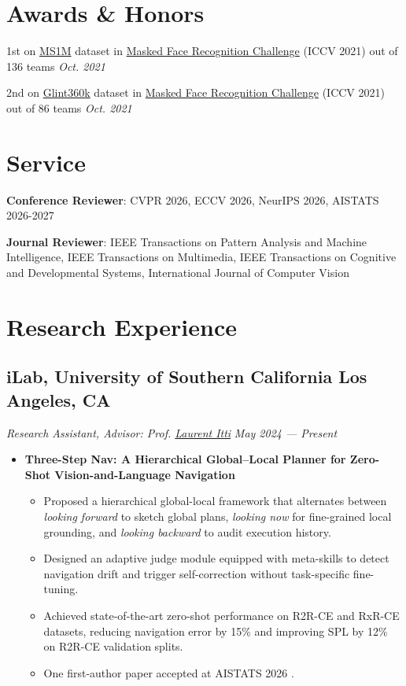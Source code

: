 \documentclass[a4,10pt]{article}
\newcommand{\subtext}[1]{
#1\par\vspace{-0.2cm}}
\newenvironment{zitemize}{
\begin{itemize}\itemsep0pt \parskip0pt \parsep1pt}
{\end{itemize}\vspace{-0.5cm}}
\begin{document}
\vspace{0.15cm}
\section{Awards \& Honors}
\noindent 1st on \href {https://arxiv.org/abs/1607.08221} {MS1M} dataset in \href {https://arxiv.org/abs/2108.08191} {Masked Face Recognition Challenge} (ICCV 2021) out of 136 teams \hfill{\textit{Oct. 2021}}

\noindent 2nd on \href {https://paperswithcode.com/dataset/glint360k} {Glint360k} dataset in \href {https://arxiv.org/abs/2108.08191} {Masked Face Recognition Challenge} (ICCV 2021) out of 86 teams \hfill{\textit{Oct. 2021}}

\section{Service}
\textbf{Conference Reviewer}: CVPR 2026, ECCV 2026, NeurIPS 2026, AISTATS 2026-2027

\textbf{Journal Reviewer}: IEEE Transactions on Pattern Analysis and Machine Intelligence, IEEE Transactions on Multimedia, IEEE Transactions on Cognitive and Developmental Systems, International Journal of Computer Vision

\section{Research Experience}

\subsection*{iLab, University of Southern California \hfill Los Angeles, CA}
\subtext{\textit{Research Assistant, Advisor: Prof. \href{http://ilab.usc.edu/itti/} {Laurent Itti} }\hfill \textit{May 2024 --- Present}}
    \begin{zitemize}
        \item \textbf{Three-Step Nav: A Hierarchical Global–Local Planner for Zero-Shot Vision-and-Language Navigation}
            \begin{itemize}
                \item Proposed a hierarchical global-local framework that alternates between \textit{looking forward} to sketch global plans, \textit{looking now} for fine-grained local grounding, and \textit{looking backward} to audit execution history.
                \item Designed an adaptive judge module equipped with meta-skills to detect navigation drift and trigger self-correction without task-specific fine-tuning.
                \item Achieved state-of-the-art zero-shot performance on R2R-CE and RxR-CE datasets, reducing navigation error by 15\% and improving SPL by 12\% on R2R-CE validation splits.
                \item One first-author paper accepted at AISTATS 2026 \cite{Pap6}.
            \end{itemize}
            
        \end{zitemize}
\end{document}
